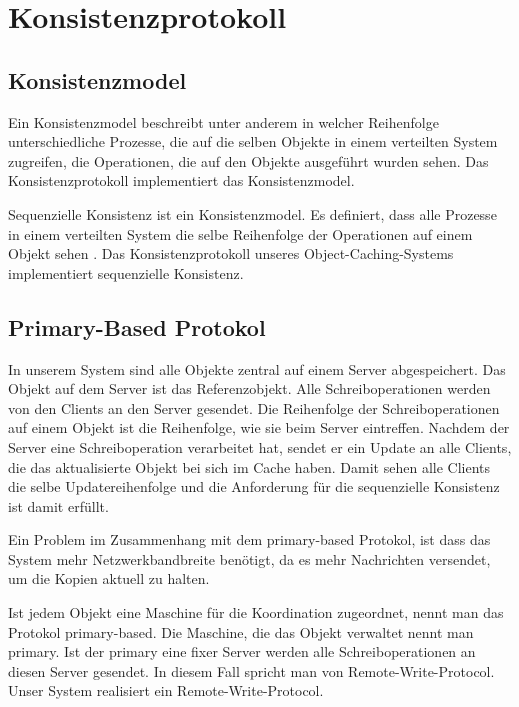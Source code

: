 \section{Konsistenzprotokoll}
\label{sec:konsistenzprotokoll}

\subsection{Konsistenzmodel}
\label{sec:konsistenzmodel}

Ein Konsistenzmodel beschreibt unter anderem in welcher Reihenfolge unterschiedliche Prozesse, die auf die selben Objekte in einem verteilten System zugreifen, die Operationen, die auf den Objekte ausgeführt wurden sehen. Das Konsistenzprotokoll implementiert das Konsistenzmodel.

Sequenzielle Konsistenz ist ein Konsistenzmodel. Es definiert, dass alle Prozesse in einem verteilten System die selbe Reihenfolge der Operationen auf einem Objekt sehen \cite{tanenbaum07}.  Das Konsistenzprotokoll unseres Object-Caching-Systems implementiert sequenzielle Konsistenz.

\subsection{Primary-Based Protokol}
\label{sec:prim-based-prot}

In unserem System sind alle Objekte zentral auf einem Server abgespeichert. Das Objekt auf dem Server ist das Referenzobjekt. Alle Schreiboperationen werden von den Clients an den Server gesendet. Die Reihenfolge der Schreiboperationen auf einem Objekt ist die Reihenfolge, wie sie beim Server eintreffen. Nachdem der Server eine Schreiboperation verarbeitet hat, sendet er ein Update an alle Clients, die das aktualisierte Objekt bei sich im Cache haben. Damit sehen alle Clients die selbe Updatereihenfolge und die Anforderung für die sequenzielle Konsistenz ist damit erfüllt. 

Ein Problem im Zusammenhang mit dem primary-based Protokol, ist dass das System mehr Netzwerkbandbreite benötigt, da es mehr Nachrichten versendet, um die Kopien aktuell zu halten.

Ist jedem Objekt eine Maschine für die Koordination zugeordnet, nennt man das Protokol primary-based\cite{tanenbaum07}. Die Maschine, die das Objekt verwaltet nennt man primary. Ist der primary eine fixer Server werden alle Schreiboperationen an diesen Server gesendet. In diesem Fall spricht man von Remote-Write-Protocol. Unser System realisiert ein Remote-Write-Protocol.

